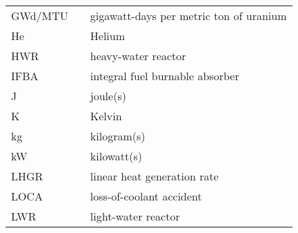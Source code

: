 \begin{ThreePartTable}
\begin{longtable}{l l l}
        GWd/MTU                     &      \hspace{0.25in}     &         gigawatt-days per metric ton of uranium            \\
        
        He                          &      \hspace{0.25in}     &         Helium                                             \\
        
        HWR                         &      \hspace{0.25in}     &         heavy-water reactor                                \\
        
        IFBA                        &      \hspace{0.25in}     &         integral fuel burnable absorber                    \\ 
        
        J                           &      \hspace{0.25in}     &         joule(s)                                           \\ 
        
        K                           &      \hspace{0.25in}     &         Kelvin                                             \\ 
        
        kg                          &      \hspace{0.25in}     &         kilogram(s)                                        \\ 
        
        kW                          &      \hspace{0.25in}     &         kilowatt(s)                                        \\ 
        
        LHGR                        &      \hspace{0.25in}     &         linear heat generation rate                        \\ 
        
        LOCA                        &      \hspace{0.25in}     &         loss-of-coolant accident                           \\ 
        
        LWR                         &      \hspace{0.25in}     &         light-water reactor                                \\ 
        

\end{longtable}
\end{ThreePartTable}
